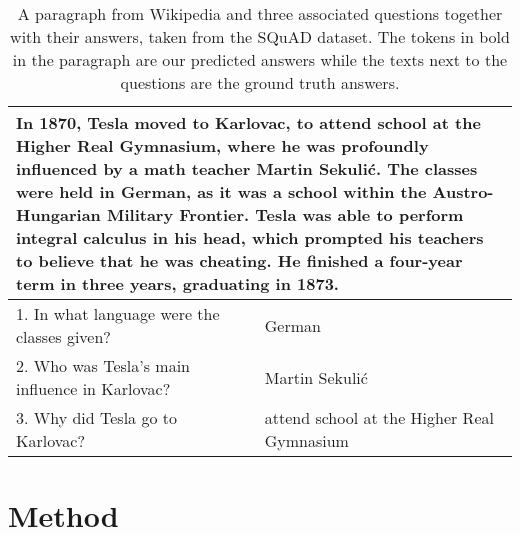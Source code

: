 \documentclass{article} \usepackage{iclr2017_conference,times}
\begin{document}
\begin{table}[]
\centering
\small
\label{tab:example}
\begin{tabular}{ll}
\toprule
\multicolumn{2}{p{13cm}}{In 1870, Tesla moved to Karlovac, \textbf{to attend school at the Higher Real Gymnasium}, where he was profoundly influenced by a math teacher \textbf{Martin Sekuli{\'c}}. The classes were held in \textbf{German}, as it was a school within the Austro-Hungarian Military Frontier. Tesla was able to perform integral calculus in his head, which prompted his teachers to believe that he was cheating. He finished a four-year term in three years, graduating in 1873.} \\ 
\midrule
1. In what language were the classes given?                                                                                                                                                                                                                                                 & German                                                                                                                                                                                                                                                                                  \\
2. Who was Tesla's main influence in Karlovac?                                                                                                                                                                                                                                              & Martin Sekuli{\'c}
\\
3. Why did Tesla go to Karlovac?                                                                                                                                                                                                                                                            & attend school at the Higher Real Gymnasium                                                                                                                                                                                                                                             
\\ \bottomrule
\end{tabular}
\normalsize
\caption{A paragraph from Wikipedia and three associated questions together with their answers, taken from the SQuAD dataset. The tokens in bold in the paragraph are our predicted answers while the texts next to the questions are the ground truth answers.}
\end{table} \section{Method}
\end{document}
